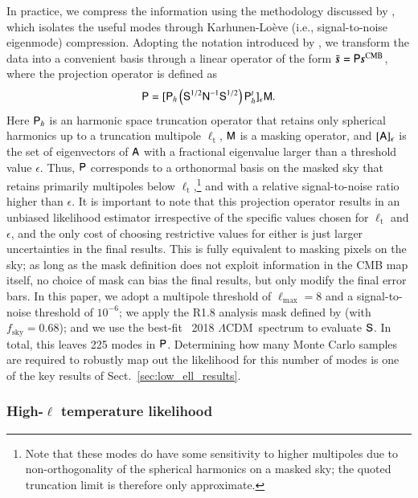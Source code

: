 \documentclass[onecolumn]{aa}
\def\LCDM{$\Lambda$CDM}
\newcommand{\A}[0]{\tens{A}}
\newcommand{\s}[0]{\vec{s}}
\newcommand{\N}[0]{\tens{N}}
\newcommand{\M}[0]{\tens{M}}
\renewcommand{\S}[0]{\tens{S}}
\renewcommand{\P}[0]{\tens{P}}
\begin{document}
In practice, we compress the information using the methodology
discussed by \citet{tegmark1997}, which isolates the useful modes
through Karhunen-Lo\`eve (i.e., signal-to-noise eigenmode)
compression. Adopting the notation introduced by \citet{gjerlow2015},
we transform the data into a convenient basis through a linear
operator of the form $\bar{\s}=\P\s^{\mathrm{CMB}}$, where the
projection operator is defined as
\begin{equation}
  \label{eq:s2n_operator}
  \P = \lbrack\P_h\left( \S^{1/2}\N^{-1}\S^{1/2} \right)\P_h^t\rbrack_\epsilon\M.
\end{equation}
Here $\P_h$ is an harmonic space truncation operator that retains only
spherical harmonics up to a truncation multipole $\ell_\mathrm{t}$,
$\M$ is a masking operator, and $\lbrack\A\rbrack_\epsilon$ is the set
of eigenvectors of $\A$ with a fractional eigenvalue larger than a
threshold value $\epsilon$. Thus, $\P$ corresponds to a orthonormal
basis on the masked sky that retains primarily multipoles below
$\ell_\mathrm{t}$,\footnote{Note that these modes do have some sensitivity to higher multipoles due to non-orthogonality of the spherical harmonics on a masked sky; the quoted truncation limit is therefore only approximate.} and with a relative
signal-to-noise ratio higher than $\epsilon$. It is important to note
that this projection operator results in an unbiased likelihood
estimator irrespective of the specific values chosen for
$\ell_\mathrm{t}$ and $\epsilon$, and the only cost of choosing
restrictive values for either is just larger uncertainties in the
final results. This is fully equivalent to masking pixels on the sky;
as long as the mask definition does not exploit information in the CMB
map itself, no choice of mask can bias the final results, but only
modify the final error bars. In this paper, we adopt a multipole
threshold of $ \ell_{\mathrm{max}}=8$ and a signal-to-noise threshold
of $10^{-6}$; we apply the R1.8 analysis mask defined by
\citet{planck2016-l05} (with $f_{\mathrm{sky}}=0.68$); and we use the
best-fit \Planck\ 2018 \LCDM\ spectrum to evaluate $\S$. In total,
this leaves 225 modes in $\P$. Determining how many Monte Carlo
samples are required to robustly map out the likelihood for this
number of modes is one of the key results of
Sect.~\ref{sec:low_ell_results}.

\subsubsection{High-$\ell$ temperature likelihood}
\end{document}
